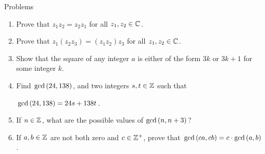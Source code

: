 \documentclass[11pt,fleqn,dvipsnames,usenames]{article}
\renewcommand{\headrulewidth}{1pt}
\begin{document}
\fancyhead[L]{\course}
\fancyhead[R]{\term}
\renewcommand{\headrulewidth}{0.4pt}

{\huge Problems}
\vsp

\begin{enumerate}
\item Prove that  $z_{1}z_{2} = z_{2}z_{1}$ for all $z_{1},z_{2}\in\mathbb{C}$.
\item Prove that  $z_{1}(z_{2}z_{3}) = (z_{1}z_{2})z_{3}$ for all $z_{1},z_{2}\in\mathbb{C}$.
\item Show that the square of any integer $a$ is either of the form $3k$ or $3k+1$ for some integer $k$.
\item Find $\text{gcd}\left(24,138\right)$, and two integers $s,t\in\mathbb{Z}$ such that
\begin{center}
$\text{gcd}\left(24,138\right) = 24s + 138t$.
\end{center}

\item If $n\in\mathbb{Z}$, what are the possible values of $\text{gcd}\left(n,n+3\right)$?
\item If $a,b\in\mathbb{Z}$ are not both zero and $c\in\mathbb{Z}^{+}$, prove that $\text{gcd}\left(ca,cb\right) = c\cdot \text{gcd}\left(a,b\right)$.
\end{enumerate}
\end{document}
